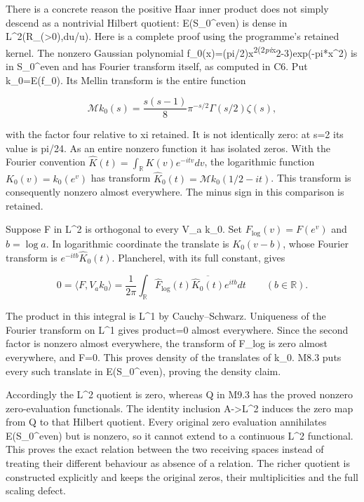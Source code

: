 \documentclass[
]{article}
\begin{document}
There is a concrete reason the positive Haar inner product does not
simply descend as a nontrivial Hilbert quotient: E(S\_0\^{}even) is
dense in L\^{}2(R\_(\textgreater0),du/u). Here is a complete proof using
the programme's retained kernel. The nonzero Gaussian polynomial
f\_0(x)=(pi/2)x\textsuperscript{2(2\emph{pi}x}2-3)exp(-pi*x\^{}2) is in
S\_0\^{}even and has Fourier transform itself, as computed in C6. Put
k\_0=E(f\_0). Its Mellin transform is the entire function

\[
\mathcal M k_0(s)=\frac{s(s-1)}8\pi^{-s/2}\Gamma(s/2)\zeta(s),
\tag{M9.5}
\]

with the factor four relative to xi retained. It is not identically
zero: at s=2 its value is pi/24. As an entire nonzero function it has
isolated zeros. With the Fourier convention
\(\widehat K(t)=\int_{\mathbb R}K(v)e^{-itv}dv\), the logarithmic
function \(K_0(v)=k_0(e^v)\) has transform
\(\widehat K_0(t)=\mathcal M k_0(1/2-it)\). This transform is
consequently nonzero almost everywhere. The minus sign in this
comparison is retained.

Suppose F in L\^{}2 is orthogonal to every V\_a k\_0. Set
\(F_{\log}(v)=F(e^v)\) and \(b=\log a\). In logarithmic coordinate the
translate is \(K_0(v-b)\), whose Fourier transform is
\(e^{-itb}\widehat K_0(t)\). Plancherel, with its full constant, gives

\[
0=\langle F,V_a k_0\rangle
=\frac1{2\pi}\int_{\mathbb R}
\widehat F_{\log}(t)\overline{\widehat K_0(t)}e^{itb}dt
\qquad(b\in\mathbb R).
\tag{M9.6}
\]

The product in this integral is L\^{}1 by Cauchy--Schwarz. Uniqueness of
the Fourier transform on L\^{}1 gives product=0 almost everywhere. Since
the second factor is nonzero almost everywhere, the transform of F\_log
is zero almost everywhere, and F=0. This proves density of the
translates of k\_0. M8.3 puts every such translate in E(S\_0\^{}even),
proving the density claim.

Accordingly the L\^{}2 quotient is zero, whereas Q in M9.3 has the
proved nonzero zero-evaluation functionals. The identity inclusion
A-\textgreater L\^{}2 induces the zero map from Q to that Hilbert
quotient. Every original zero evaluation annihilates E(S\_0\^{}even) but
is nonzero, so it cannot extend to a continuous L\^{}2 functional. This
proves the exact relation between the two receiving spaces instead of
treating their different behaviour as absence of a relation. The richer
quotient is constructed explicitly and keeps the original zeros, their
multiplicities and the full scaling defect.
\end{document}
